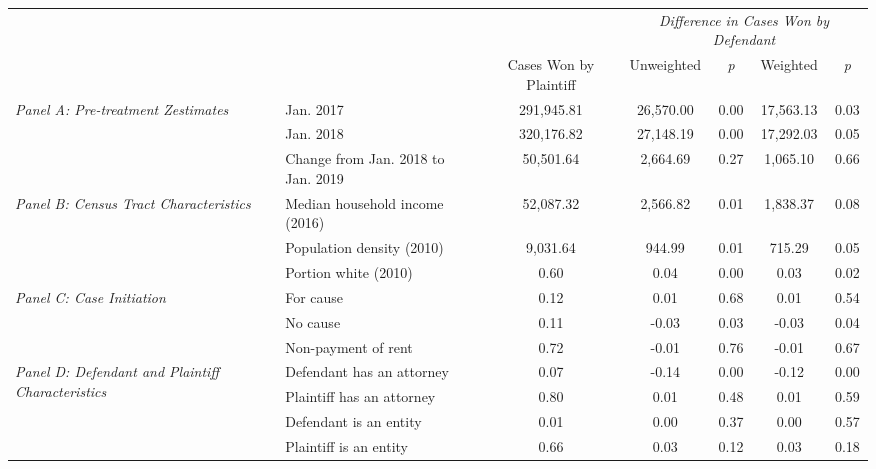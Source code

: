 \begin{tabular}{llccccc}
\toprule
 &  & \textit{} & \multicolumn{4}{c}{\textit{Difference in Cases Won by Defendant}} \\
 &  & Cases Won by Plaintiff & Unweighted & \emph{p} & Weighted & \emph{p} \\
\midrule
\multirow[c]{3}{3cm}{\textit{Panel A: Pre-treatment Zestimates}} & Jan. 2017 & 291,945.81 & 26,570.00 & 0.00 & 17,563.13 & 0.03 \\
 & Jan. 2018 & 320,176.82 & 27,148.19 & 0.00 & 17,292.03 & 0.05 \\
 & Change from Jan. 2018 to Jan. 2019 & 50,501.64 & 2,664.69 & 0.27 & 1,065.10 & 0.66 \\
\cline{1-7}
\multirow[c]{3}{3cm}{\textit{Panel B: Census Tract Characteristics}} & Median household income (2016) & 52,087.32 & 2,566.82 & 0.01 & 1,838.37 & 0.08 \\
 & Population density (2010) & 9,031.64 & 944.99 & 0.01 & 715.29 & 0.05 \\
 & Portion white (2010) & 0.60 & 0.04 & 0.00 & 0.03 & 0.02 \\
\cline{1-7}
\multirow[c]{3}{3cm}{\textit{Panel C: Case Initiation}} & For cause & 0.12 & 0.01 & 0.68 & 0.01 & 0.54 \\
 & No cause & 0.11 & -0.03 & 0.03 & -0.03 & 0.04 \\
 & Non-payment of rent & 0.72 & -0.01 & 0.76 & -0.01 & 0.67 \\
\cline{1-7}
\multirow[c]{4}{3cm}{\textit{Panel D: Defendant and Plaintiff Characteristics}} & Defendant has an attorney & 0.07 & -0.14 & 0.00 & -0.12 & 0.00 \\
 & Plaintiff has an attorney & 0.80 & 0.01 & 0.48 & 0.01 & 0.59 \\
 & Defendant is an entity & 0.01 & 0.00 & 0.37 & 0.00 & 0.57 \\
 & Plaintiff is an entity & 0.66 & 0.03 & 0.12 & 0.03 & 0.18 \\
\cline{1-7}
\bottomrule
\end{tabular}
